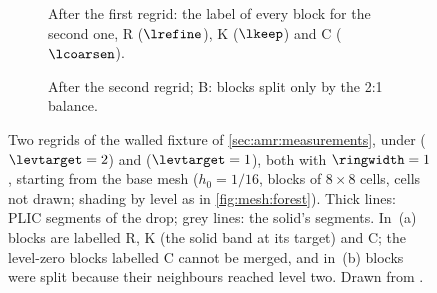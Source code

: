 \begin{figure}
  \centering
  \def\fxanone{%
    \def\fxablock##1##2##3##4##5##6##7{}\def\fxaplic##1##2##3##4##5{}%
    \def\fxasolid##1##2##3##4##5{}\def\fxacell##1##2##3##4{}}%
  \def\fxapanel#1{%
    \fxanone
    \def\fxablock##1##2##3##4##5##6##7{\ifnum##1=#1
      \path[tr level ##6] (##2,##3) rectangle (##4,##5);\fi}%
    \fxanone
    \def\fxablock##1##2##3##4##5##6##7{\ifnum##1=#1
      \draw[tr block,line width=0.5pt] (##2,##3) rectangle (##4,##5);
      \ifx\relax##7\relax\else
        \node[tr tiny,fill=white,rounded corners=0.4pt] at ({(##2+##4)/2},{(##3+##5)/2}) {\textsf{##7}};
      \fi\fi}%
    \def\fxasolid##1##2##3##4##5{\ifnum##1=#1 \draw[tr solid line] (##2,##3) -- (##4,##5);\fi}%
    \def\fxaplic##1##2##3##4##5{\ifnum##1=#1 \draw[tr plic] (##2,##3) -- (##4,##5);\fi}%
    \fxanone
    \draw[line width=0.9pt] (0,0) rectangle (2,1);}%
  \begin{subfigure}{\textwidth}
    \centering
    \caption{After the first regrid: the label of every block for the second
      one, \textsf{R} ($\lrefine$), \textsf{K} ($\lkeep$) and \textsf{C}
      ($\lcoarsen$).}
    \label{fig:amr:regrid:labels}
  \end{subfigure}

  \medskip
  \begin{subfigure}{\textwidth}
    \centering
    \caption{After the second regrid; \textsf{B}: blocks split only by the
      2:1 balance.}
    \label{fig:amr:regrid:forest}
  \end{subfigure}
  \caption{Two regrids of the walled fixture of \cref{sec:amr:measurements},
    under  ($\levtarget=2$) and
     ($\levtarget=1$), both with
    $\ringwidth=1$, starting from the base mesh ($h_0=1/16$, blocks of
    $8\times8$ cells, cells not drawn; shading by level as in
    \cref{fig:mesh:forest}). Thick lines: PLIC segments of the drop; grey
    lines: the solid's segments. In~(a) \chkAmrFigRefine{} blocks are labelled
    \textsf{R}, \chkAmrFigKeep{} \textsf{K} (the solid band at its target)
    and \chkAmrFigCoarsen{} \textsf{C}; the level-zero blocks labelled
    \textsf{C} cannot be merged, and in~(b) \chkAmrFigBalance{} blocks were
    split because their neighbours reached level two. Drawn from
    .}
  \label{fig:amr:regrid}
\end{figure}
